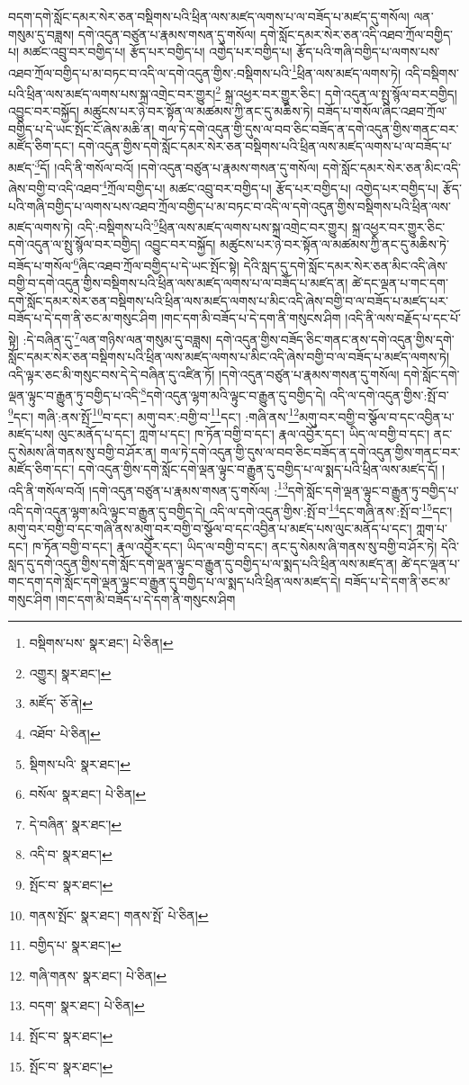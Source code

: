 བདག་དགེ་སློང་དམར་སེར་ཅན་བསྡིགས་པའི་ཕྲིན་ལས་མཛད་ལགས་པ་ལ་བཟོད་པ་མཛད་དུ་གསོལ། ལན་གསུམ་དུ་བཟླས། དགེ་འདུན་བཙུན་པ་རྣམས་གསན་དུ་གསོལ། དགེ་སློང་དམར་སེར་ཅན་འདི་འཐབ་ཀྲོལ་བགྱིད་པ། མཚང་འབྲུ་བར་བགྱིད་པ། རྩོད་པར་བགྱིད་པ། འགྱེད་པར་བགྱིད་པ། རྩོད་པའི་གཞི་བགྱིད་པ་ལགས་པས་འཐབ་ཀྲོལ་བགྱིད་པ་མ་བཏང་བ་འདི་ལ་དགེ་འདུན་གྱིས་:བསྡིགས་པའི་\footnote{བསྡིགས་པས་  སྣར་ཐང་།  པེ་ཅིན། }ཕྲིན་ལས་མཛད་ལགས་ཏེ། འདི་བསྡིགས་པའི་ཕྲིན་ལས་མཛད་ལགས་པས་སྐྲ་འགྲེང་བར་གྱུར།\footnote{འགྱུར།  སྣར་ཐང་། } སྐྲ་འཕྱར་བར་གྱུར་ཅིང་། དགེ་འདུན་ལ་སྤུ་སྙོལ་བར་བགྱིད། འབྱུང་བར་བསྐྱོད། མཚུངས་པར་ཉེ་བར་སྟོན་ལ་མཚམས་ཀྱི་ནང་དུ་མཆིས་ཏེ། བཟོད་པ་གསོལ་ཞིང་འཐབ་ཀྲོལ་བགྱིད་པ་དེ་ཡང་སྤོང་ངོ་ཞེས་མཆི་ན། གལ་ཏེ་དགེ་འདུན་གྱི་དུས་ལ་བབ་ཅིང་བཟོད་ན་དགེ་འདུན་གྱིས་གནང་བར་མཛོད་ཅིག་དང་། དགེ་འདུན་གྱིས་དགེ་སློང་དམར་སེར་ཅན་བསྡིགས་པའི་ཕྲིན་ལས་མཛད་ལགས་པ་ལ་བཟོད་པ་མཛད་\footnote{མཛོད་  ཅོ་ནེ། }དོ། །འདི་ནི་གསོལ་བའོ། །དགེ་འདུན་བཙུན་པ་རྣམས་གསན་དུ་གསོལ། དགེ་སློང་དམར་སེར་ཅན་མིང་འདི་ཞེས་བགྱི་བ་འདི་འཐབ་\footnote{འཐོབ་  པེ་ཅིན། }ཀྲོལ་བགྱིད་པ། མཚང་འབྲུ་བར་བགྱིད་པ། རྩོད་པར་བགྱིད་པ། འགྱེད་པར་བགྱིད་པ། རྩོད་པའི་གཞི་བགྱིད་པ་ལགས་པས་འཐབ་ཀྲོལ་བགྱིད་པ་མ་བཏང་བ་འདི་ལ་དགེ་འདུན་གྱིས་བསྡིགས་པའི་ཕྲིན་ལས་མཛད་ལགས་ཏེ། འདི་:བསྡིགས་པའི་\footnote{སྡིགས་པའི་  སྣར་ཐང་། }ཕྲིན་ལས་མཛད་ལགས་པས་སྐྲ་འགྲེང་བར་གྱུར། སྐྲ་འཕྱར་བར་གྱུར་ཅིང་དགེ་འདུན་ལ་སྤུ་སྙོལ་བར་བགྱིད། འབྱུང་བར་བསྐྱོད། མཚུངས་པར་ཉེ་བར་སྟོན་ལ་མཚམས་ཀྱི་ནང་དུ་མཆིས་ཏེ་བཟོད་པ་གསོལ་\footnote{བསོལ་  སྣར་ཐང་།  པེ་ཅིན། }ཞིང་འཐབ་ཀྲོལ་བགྱིད་པ་དེ་ཡང་སྤོང་སྟེ། དེའི་སླད་དུ་དགེ་སློང་དམར་སེར་ཅན་མིང་འདི་ཞེས་བགྱི་བ་དགེ་འདུན་གྱིས་བསྡིགས་པའི་ཕྲིན་ལས་མཛད་ལགས་པ་ལ་བཟོད་པ་མཛད་ན། ཚེ་དང་ལྡན་པ་གང་དག་དགེ་སློང་དམར་སེར་ཅན་བསྡིགས་པའི་ཕྲིན་ལས་མཛད་ལགས་པ་མིང་འདི་ཞེས་བགྱི་བ་ལ་བཟོད་པ་མཛད་པར་བཟོད་པ་དེ་དག་ནི་ཅང་མ་གསུང་ཤིག །གང་དག་མི་བཟོད་པ་དེ་དག་ནི་གསུངས་ཤིག །འདི་ནི་ལས་བརྗོད་པ་དང་པོ་སྟེ། :དེ་བཞིན་དུ་\footnote{དེ་བཞིན་  སྣར་ཐང་། }ལན་གཉིས་ལན་གསུམ་དུ་བཟླས། དགེ་འདུན་གྱིས་བཟོད་ཅིང་གནང་ནས་དགེ་འདུན་གྱིས་དགེ་སློང་དམར་སེར་ཅན་བསྡིགས་པའི་ཕྲིན་ལས་མཛད་ལགས་པ་མིང་འདི་ཞེས་བགྱི་བ་ལ་བཟོད་པ་མཛད་ལགས་ཏེ། འདི་ལྟར་ཅང་མི་གསུང་བས་དེ་དེ་བཞིན་དུ་འཛིན་ཏོ། །དགེ་འདུན་བཙུན་པ་རྣམས་གསན་དུ་གསོལ། དགེ་སློང་དགེ་ལྡན་ལྟུང་བ་རྒྱུན་ཏུ་བགྱིད་པ་འདི་\footnote{འདི་བ་  སྣར་ཐང་། }དགེ་འདུན་ལྷག་མའི་ལྟུང་བ་རྒྱུན་དུ་བགྱིད་དེ། འདི་ལ་དགེ་འདུན་གྱིས་:སྤོ་བ་\footnote{སྤོང་བ་  སྣར་ཐང་། }དང་། གཞི་:ནས་སྤོ་\footnote{གནས་སྤོང་  སྣར་ཐང་། གནས་སྤོ་  པེ་ཅིན། }བ་དང་། མགུ་བར་:བགྱི་བ་\footnote{བགྱིད་པ་  སྣར་ཐང་། }དང་། :གཞི་ནས་\footnote{གཞི་གནས་  སྣར་ཐང་།  པེ་ཅིན། }མགུ་བར་བགྱི་བ་སྩོལ་བ་དང་འབྱིན་པ་མཛད་པས། ལུང་མནོད་པ་དང་། ཀླག་པ་དང་། ཁ་ཏོན་བགྱི་བ་དང་། རྣལ་འབྱོར་དང་། ཡིད་ལ་བགྱི་བ་དང་། ནང་དུ་སེམས་ཞི་གནས་སུ་བགྱི་བ་ཤོར་ན། གལ་ཏེ་དགེ་འདུན་གྱི་དུས་ལ་བབ་ཅིང་བཟོད་ན་དགེ་འདུན་གྱིས་གནང་བར་མཛོད་ཅིག་དང་། དགེ་འདུན་གྱིས་དགེ་སློང་དགེ་ལྡན་ལྟུང་བ་རྒྱུན་དུ་བགྱིད་པ་ལ་སྨད་པའི་ཕྲིན་ལས་མཛད་དོ། །འདི་ནི་གསོལ་བའོ། །དགེ་འདུན་བཙུན་པ་རྣམས་གསན་དུ་གསོལ། :\footnote{བདག་  སྣར་ཐང་།  པེ་ཅིན། }དགེ་སློང་དགེ་ལྡན་ལྟུང་བ་རྒྱུན་ཏུ་བགྱིད་པ་འདི་དགེ་འདུན་ལྷག་མའི་ལྟུང་བ་རྒྱུན་དུ་བགྱིད་དེ། འདི་ལ་དགེ་འདུན་གྱིས་:སྤོ་བ་\footnote{སྤོང་བ་  སྣར་ཐང་། }དང་གཞི་ནས་:སྤོ་བ་\footnote{སྤོང་བ་  སྣར་ཐང་། }དང་། མགུ་བར་བགྱི་བ་དང་གཞི་ནས་མགུ་བར་བགྱི་བ་སྩོལ་བ་དང་འབྱིན་པ་མཛད་པས་ལུང་མནོད་པ་དང་། ཀླག་པ་དང་། ཁ་ཏོན་བགྱི་བ་དང་། རྣལ་འབྱོར་དང་། ཡིད་ལ་བགྱི་བ་དང་། ནང་དུ་སེམས་ཞི་གནས་སུ་བགྱི་བ་ཤོར་ཏེ། དེའི་སླད་དུ་དགེ་འདུན་གྱིས་དགེ་སློང་དགེ་ལྡན་ལྟུང་བ་རྒྱུན་དུ་བགྱིད་པ་ལ་སྨད་པའི་ཕྲིན་ལས་མཛད་ན། ཚེ་དང་ལྡན་པ་གང་དག་དགེ་སློང་དགེ་ལྡན་ལྟུང་བ་རྒྱུན་དུ་བགྱིད་པ་ལ་སྨད་པའི་ཕྲིན་ལས་མཛད་དེ། བཟོད་པ་དེ་དག་ནི་ཅང་མ་གསུང་ཤིག །གང་དག་མི་བཟོད་པ་དེ་དག་ནི་གསུངས་ཤིག 